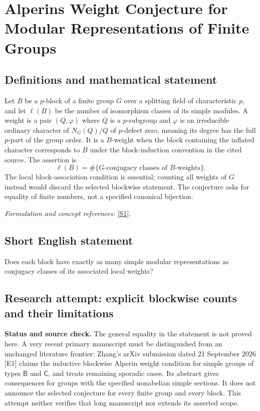 \documentclass[11pt]{article}
\begin{document}
\section*{\texorpdfstring{Alperins Weight Conjecture for Modular Representations of Finite Groups}{Alperins Weight Conjecture for Modular Representations of Finite Groups}}\label{30006871}
\subsection{Definitions and mathematical statement}
Let $B$ be a $p$-block of a finite group $G$ over a splitting field of characteristic $p$, and let $\ell(B)$ be the number of isomorphism classes of its simple modules. A weight is a pair $(Q,\varphi)$ where $Q$ is a $p$-subgroup and $\varphi$ is an irreducible ordinary character of $N_G(Q)/Q$ of $p$-defect zero, meaning its degree has the full $p$-part of the group order. It is a $B$-weight when the block containing the inflated character corresponds to $B$ under the block-induction convention in the cited source. The assertion is
\[
 \ell(B)=\#\{G\text{-conjugacy classes of }B\text{-weights}\}.
\]
The local block-association condition is essential; counting all weights of $G$ instead would discard the selected blockwise statement. The conjecture asks for equality of finite numbers, not a specified canonical bijection.
\par\smallskip\textit{Formulation and concept references:} \href{https://par.nsf.gov/servlets/purl/10275354}{[S1]}.

\subsection{Short English statement}
Does each block have exactly as many simple modular representations as conjugacy classes of its associated local weights?
\subsection{Research attempt: explicit blockwise counts and their limitations}
\textbf{Status and source check.} The general equality in the statement is not proved here. A very recent primary manuscript must be distinguished from an unchanged literature frontier: Zhang's arXiv submission dated 21 September 2026 [E1] claims the inductive blockwise Alperin weight condition for simple groups of types $\mathsf B$ and $\mathsf C$, and treats remaining sporadic cases. Its abstract gives consequences for groups with the specified nonabelian simple sections. It does not announce the selected conjecture for every finite group and every block. This attempt neither verifies that long manuscript nor extends its asserted scope.
\end{document}
